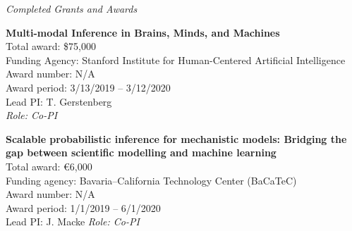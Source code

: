 \documentclass[10pt]{article}
\renewcommand{\section}[1]{\pagebreak[3]%
    \hyphenpenalty=10000%
    \vspace{1.3\baselineskip}%
    \noindent\llap{\scshape\smash{\parbox[t]{\marginparwidth}{\raggedright #1}}}%
    \vspace{-\baselineskip}\par}
\begin{document}
\vspace{1em}

\textit{Completed Grants and Awards}

\begin{outerlist}
\item \textbf{Multi-modal Inference in Brains, Minds, and Machines} \\
  Total award: \$75,000 \\
  Funding Agency: Stanford Institute for Human-Centered Artificial Intelligence \\
  Award number: N/A \\
  Award period: 3/13/2019 -- 3/12/2020 \\
  Lead PI: T. Gerstenberg \\
  \textit{Role: Co-PI}

\item \textbf{Scalable probabilistic inference for mechanistic models: Bridging the
    gap between scientific modelling and machine learning} \\
  Total award: \euro{}6,000\\
  Funding agency: Bavaria--California Technology Center (BaCaTeC)\\
  Award number: N/A \\
  Award period: 1/1/2019 -- 6/1/2020 \\
  Lead PI: J. Macke
  \textit{Role: Co-PI}

\end{outerlist}




\end{document}
